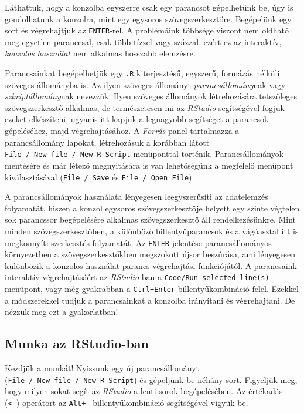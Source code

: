 \documentclass[
]{book}
\begin{document}
Láthattuk, hogy a konzolba egyszerre csak egy parancsot gépelhetünk be, úgy is gondolhatunk a konzolra, mint egy egysoros szövegszerkesztőre. Begépelünk egy sort és végrehajtjuk az \texttt{ENTER}-rel. A problémáink többsége viszont nem oldható meg egyetlen paranccsal, csak több tízzel vagy százzal, ezért ez az interaktív, \emph{konzolos használat} nem alkalmas hosszabb elemzésre.

Parancsainkat begépelhetjük egy \texttt{.R} kiterjesztésű, egyszerű, formázás nélküli szöveges állományba is. Az ilyen szöveges állományt \emph{parancsállomány}nak vagy \emph{szkriptállomány}nak nevezzük. Ilyen szöveges állományok létrehozására tetszőleges szövegszerkesztő alkalmas, de természetesen mi az \emph{RStudio} segítségével fogjuk ezeket elkészíteni, ugyanis itt kapjuk a legnagyobb segítséget a parancsok gépeléséhez, majd végrehajtásához. A \emph{Forrás} panel tartalmazza a parancsállomány lapokat, létrehozásuk a korábban látott \texttt{File\ /\ New\ file\ /\ New\ R\ Script} menüponttal történik. Parancsállományok mentésére és már létező megnyitására is van lehetőségünk a megfelelő menüpont kiválasztásával (\texttt{File\ /\ Save} és \texttt{File\ /\ Open\ File}).

A parancsállományok használata lényegesen leegyszerűsíti az adatelemzés folyamatát, hiszen a konzol egysoros szövegszerkesztője helyett egy szinte végtelen sok parancssor begépelésére alkalmas szövegszerkesztő áll rendelkezésünkre. Mint minden szövegszerkesztőben, a különböző billentyűparancsok és a vágóasztal itt is megkönnyíti szerkesztés folyamatát. Az \texttt{ENTER} jelentése parancsállományos környezetben a szövegszerkesztőkben megszokott újsor beszúrása, ami lényegesen különbözik a konzolos használat parancs végrehajtási funkciójától. A parancsaink interaktív végrehajtásáért az \emph{RStudio}-ban a \texttt{Code/Run\ selected\ line(s)} menüpont, vagy még gyakrabban a \texttt{Ctrl+Enter} billentyűkombináció felel. Ezekkel a módszerekkel tudjuk a parancsainkat a konzolba irányítani és végrehajtani. De nézzük meg ezt a gyakorlatban!

\hypertarget{munka-az-rstudio-ban}{%
\subsection{Munka az RStudio-ban}\label{munka-az-rstudio-ban}}

Kezdjük a munkát! Nyissunk egy új parancsállományt (\texttt{File\ /\ New\ file\ /\ New\ R\ Script}) és gépeljünk be néhány sort. Figyeljük meg, hogy milyen sokat segít az \emph{RStudio} a lenti sorok begépelésében. Az értékadás (\texttt{\textless{}-}) operátort az \texttt{Alt+-} billentyűkombináció segítségével vigyük be.
\end{document}
